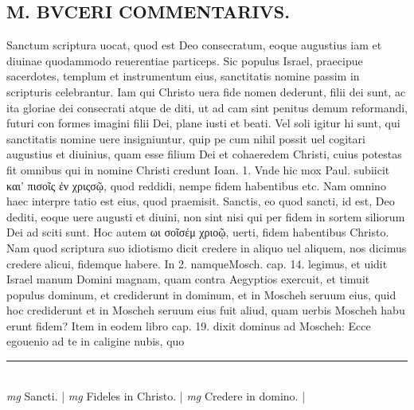 \documentclass{article}
\begin{document}
\begin{pages}
\section*{M. BVCERI COMMENTARIVS.  }
\marginpar{[ p.19 ]}\pstart Sanctum scriptura uocat, quod est Deo consecratum, eoque augustius iam et diuinae quodammodo reuerentiae particeps.  Sic populus Israel, praecipue sacerdotes, templum et instrumentum eius, sanctitatis nomine passim in scripturis celebrantur.  Iam qui Christo uera fide nomen dederunt, filii dei sunt, ac ita gloriae dei consecrati atque de diti, ut ad cam sint penitus demum reformandi, futuri con formes imagini filii Dei, plane iusti et beati.  Vel soli igitur hi sunt, qui sanctitatis nomine uere insigniuntur, quip pe cum nihil possit uel cogitari augustius et diuinius, quam esse filium Dei et cohaeredem Christi, cuius potestas fit omnibus qui in nomine Christi credunt Ioan. 1.  Vnde hic mox Paul.  subiicit και' πισοῖς ἐν χριςσῷ, quod reddidi, nempe fidem habentibus etc. Nam omnino haec interpre tatio est eius, quod praemisit. Sanctis, eo quod sancti, id est, Deo dediti, eoque uere augusti et diuini, non sint nisi qui per fidem in sortem siliorum Dei ad sciti sunt.  \pend\pstart Hoc autem ωι σοῖσέμ χριοῷ, uerti, fidem habentibus Christo.  Nam quod scriptura suo idiotismo dicit credere in aliquo uel aliquem, nos dicimus credere alicui, fidemque habere.  In 2.  namqueMosch.  cap. 14. legimus, et uidit Israel manum Domini magnam, quam contra Aegyptios exercuit, et timuit populus dominum, et crediderunt in dominum, et in Moscheh seruum eius, quid hoc crediderunt et in Moscheh seruum eius fuit aliud, quam uerbis Moscheh habu erunt fidem? Item in eodem libro cap. 19. dixit dominus ad Moscheh: Ecce egouenio ad te in caligine nubis, quo  \pend
\vspace{0.5cm}\noindent
\vspace{0.2cm}\rule{1cm}{0.2pt}\\ 
\hspace{0.2cm}\textit{mg}
\footnotesize Sancti. 
\normalsize| 
\hspace{0.2cm}\textit{mg}
\footnotesize Fideles in Christo. 
\normalsize| 
\hspace{0.2cm}\textit{mg}
\footnotesize Credere in domino. 
\normalsize| 

\end{pages}
\end{document}
